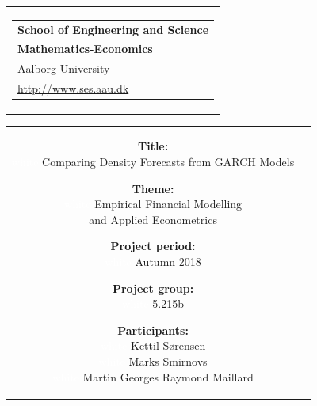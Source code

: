 \thispagestyle{empty}
{\samepage 
\begin{tabular}{r}
	\parbox{\textwidth}{  
	\hfill \parbox{6.5cm}{\begin{tabular}{l} %
		{\small \textbf{School of Engineering and Science}}\\
		{\small \textbf{Mathematics-Economics}}\\
		{\small Aalborg University} \\
		{\small \url{http://www.ses.aau.dk}}
	\end{tabular}}
	}
\end{tabular}

\begin{tabular}{cc}
	\parbox{8cm}{
	\vspace{0.8cm}
	\begin{description}
    	\item {\textbf{Title:}}\\
        \textcolor{white}{white} Comparing Density Forecasts from GARCH Models\\
    \item { \textbf{Theme:}}\\ 
		\textcolor{white}{white} Empirical Financial Modelling \\ and Applied Econometrics\\
	\end{description}
	
	\parbox{8cm}{
	\begin{description}
		\item {\textbf{Project period:}}\\
		    \textcolor{white}{white} Autumn 2018	\\
 		\hspace{2cm}
		\item {\textbf{Project group:}}\\
  			\textcolor{white}{white} 5.215b
 		\hspace{2cm}
		\item {\textbf{Participants:}}\\
			\textcolor{white}{white} Kettil Sørensen\\
			\textcolor{white}{white} Marks Smirnovs\\
			\textcolor{white}{white} Martin Georges Raymond Maillard\\
		

\end{description}}}
\end{tabular}}
